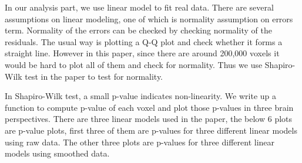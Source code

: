 In our analysis part, we use linear model to fit real data. There are several
assumptions on linear modeling, one of which is normality assumption on errors 
term. Normality of the errors can be checked by checking normality of the 
residuals. The usual way is plotting a Q-Q plot and check whether it forms a 
straight line. However in this paper, since there are around 200,000 voxels
it would be hard to plot all of them and check for normality. Thus we use 
Shapiro-Wilk test in the paper to test for normality.

In Shapiro-Wilk test, a small p-value indicates non-linearity. We write up a
function to compute p-value of each voxel and plot those p-values in three
brain perspectives. There are three linear models used in the paper, the below
6 plots are p-value plots, first three of them are p-values for three different
linear models using raw data. The other three plots are p-values for three 
different linear models using smoothed data. 









